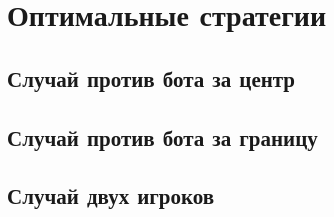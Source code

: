 \chapter{Оптимальные стратегии}\label{ch:ch4}

\section{Случай против бота за центр}\label{sec:ch4/sec1}

\section{Случай против бота за границу}\label{sec:ch4/sec2}

\section{Случай двух игроков}\label{sec:ch4/sec3}


